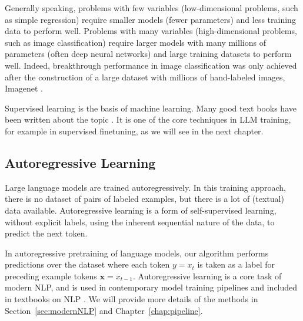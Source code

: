 Generally speaking, problems with few variables (low-dimensional problems, such as simple regression) require smaller models (fewer parameters) and less training data to perform well. Problems with many variables (high-dimensional problems, such as image classification) require larger models  with many millions of parameters (often deep neural networks) and large training datasets to perform well. Indeed,  breakthrough performance in image classification \citep{krizhevsky2012imagenet} was only achieved after the construction of a large dataset with millions of hand-labeled images, Imagenet \citep{deng2009imagenet}.

Supervised learning is the basis of machine learning. Many good text books have been written about the topic \citep{bishop2023deep,goodfellow2016deep}. It is one of the core techniques in LLM training, for example in supervised finetuning, as we will see in the next chapter.

\subsection{Autoregressive Learning} 
Large language models are trained autoregressively. In this training approach, there is no dataset of pairs of labeled examples, but there is a lot of (textual) data available. Autoregressive learning is a form of self-supervised learning, without explicit labels, using the inherent sequential nature of the data, to predict the next token. 

In autoregressive pretraining of language models, our algorithm performs predictions over the dataset where each token $y=x_t$ is taken as a label for preceding example tokens $\mathbf{x}=x_{t-1}$. Autoregressive learning is a core task of modern NLP, and is used in contemporary model training pipelines \citep{radford2018improving} and included in textbooks on NLP \citep{jm3}. We will provide more details of the methods in Section~\ref{sec:modernNLP} and Chapter~\ref{chap:pipeline}.

